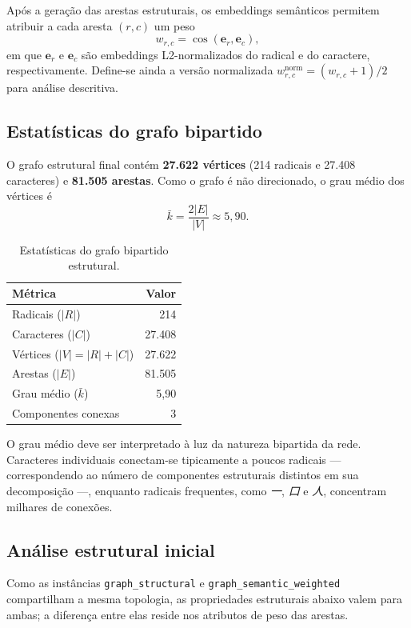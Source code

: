 \documentclass[10pt, a4paper, titlepage]{extarticle}
\begin{document}
Após a geração das arestas estruturais, os embeddings semânticos permitem atribuir a cada aresta $(r,c)$ um peso
\[
w_{r,c} = \cos(\mathbf{e}_r, \mathbf{e}_c),
\]
em que $\mathbf{e}_r$ e $\mathbf{e}_c$ são embeddings L2-normalizados do radical e do caractere, respectivamente. Define-se ainda a versão normalizada $w^{\mathrm{norm}}_{r,c} = (w_{r,c}+1)/2$ para análise descritiva.

\subsection{Estatísticas do grafo bipartido}
O grafo estrutural final contém \textbf{27.622 vértices} (214 radicais e 27.408 caracteres) e \textbf{81.505 arestas}. Como o grafo é não direcionado, o grau médio dos vértices é
\[
\bar{k} = \frac{2|E|}{|V|} \approx 5{,}90.
\]

\begin{table}[H]
\centering
\renewcommand{\arraystretch}{1.2}
\begin{tabular}{lr}
\toprule
\textbf{Métrica} & \textbf{Valor} \\
\midrule
Radicais ($|R|$) & 214 \\
Caracteres ($|C|$) & 27.408 \\
Vértices ($|V| = |R| + |C|$) & 27.622 \\
Arestas ($|E|$) & 81.505 \\
Grau médio ($\bar{k}$) & 5,90 \\
Componentes conexas & 3 \\
\bottomrule
\end{tabular}
\caption{Estatísticas do grafo bipartido estrutural.}
\label{tab:estatisticas-grafo}
\end{table}

O grau médio deve ser interpretado à luz da natureza bipartida da rede. Caracteres individuais conectam-se tipicamente a poucos radicais --- correspondendo ao número de componentes estruturais distintos em sua decomposição ---, enquanto radicais frequentes, como \textit{一}, \textit{口} e \textit{人}, concentram milhares de conexões.

\subsection{Análise estrutural inicial}
Como as instâncias \texttt{graph\_structural} e \texttt{graph\_semantic\_weighted} compartilham a mesma topologia, as propriedades estruturais abaixo valem para ambas; a diferença entre elas reside nos atributos de peso das arestas.
\end{document}
